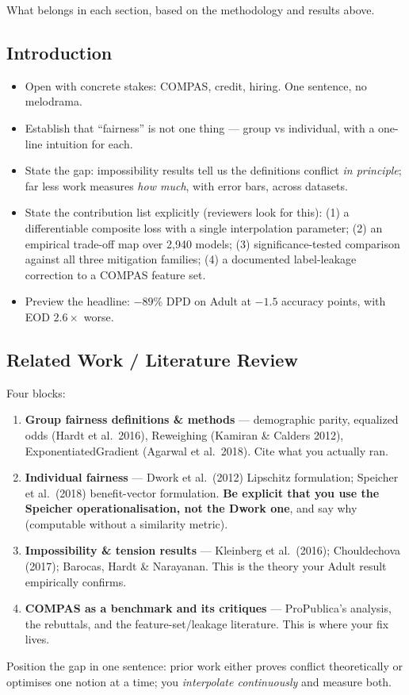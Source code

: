 What belongs in each section, based on the methodology and results above.

\subsection{Introduction}
\begin{itemize}
\item Open with concrete stakes: COMPAS, credit, hiring. One sentence, no
melodrama.
\item Establish that ``fairness'' is not one thing --- group vs individual, with
a one-line intuition for each.
\item State the gap: impossibility results tell us the definitions conflict
\emph{in principle}; far less work measures \emph{how much}, with error bars,
across datasets.
\item State the contribution list explicitly (reviewers look for this):
(1) a differentiable composite loss with a single interpolation parameter;
(2) an empirical trade-off map over 2{,}940 models;
(3) significance-tested comparison against all three mitigation families;
(4) a documented label-leakage correction to a COMPAS feature set.
\item Preview the headline: $-89\%$ DPD on Adult at $-1.5$ accuracy points,
with EOD $2.6\times$ worse.
\end{itemize}

\subsection{Related Work / Literature Review}
Four blocks:
\begin{enumerate}
\item \textbf{Group fairness definitions \& methods} --- demographic parity,
equalized odds (Hardt et al.\ 2016), Reweighing (Kamiran \& Calders 2012),
ExponentiatedGradient (Agarwal et al.\ 2018). Cite what you actually ran.
\item \textbf{Individual fairness} --- Dwork et al.\ (2012) Lipschitz
formulation; Speicher et al.\ (2018) benefit-vector formulation. \textbf{Be
explicit that you use the Speicher operationalisation, not the Dwork one}, and
say why (computable without a similarity metric).
\item \textbf{Impossibility \& tension results} --- Kleinberg et al.\ (2016);
Chouldechova (2017); Barocas, Hardt \& Narayanan. This is the theory your Adult
result empirically confirms.
\item \textbf{COMPAS as a benchmark and its critiques} --- ProPublica's
analysis, the rebuttals, and the feature-set/leakage literature. This is where
your  fix lives.
\end{enumerate}
Position the gap in one sentence: prior work either proves conflict
theoretically or optimises one notion at a time; you \emph{interpolate
continuously} and measure both.

